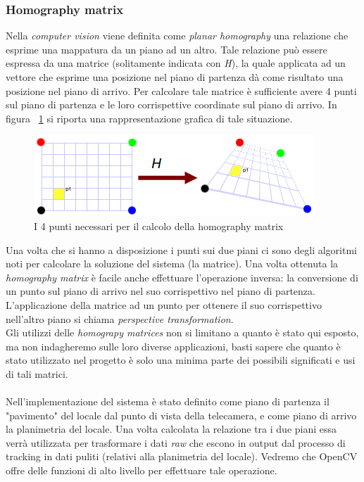 \subsubsection{Homography matrix}

Nella \textit{computer vision} viene definita come \textit{planar homography} una relazione che esprime una mappatura da un piano ad un altro. Tale relazione può essere espressa da una matrice (solitamente indicata con \textit{H}), la quale applicata ad un vettore che esprime una posizione nel piano di partenza dà come risultato una posizione nel piano di arrivo. Per calcolare tale matrice è sufficiente avere 4 punti sul piano di partenza e le loro corrispettive coordinate sul piano di arrivo. In figura ~\ref{fig:track2} si riporta una rappresentazione grafica di tale situazione.
\begin{figure}[htpb] 
\centering 
\includegraphics[scale=1.0]{./images/track2.png} 
\caption{I 4 punti necessari per il calcolo della homography matrix} 
\label{fig:track2}
\end{figure} 

Una volta che si hanno a disposizione i punti sui due piani ci sono degli algoritmi noti per calcolare la soluzione del sistema (la matrice). Una volta ottenuta la \textit{homography matrix} è facile anche effettuare l'operazione inversa: la conversione di un punto sul piano di arrivo nel suo corrispettivo nel piano di partenza. L'applicazione della matrice ad un punto per ottenere il suo corrispettivo nell'altro piano si chiama \textit{perspective transformation}. \\
Gli utilizzi delle \textit{homograpy matrices} non si limitano a quanto è stato qui esposto, ma non indagheremo sulle loro diverse applicazioni, basti sapere che quanto è stato utilizzato nel progetto è solo una minima parte dei possibili significati e usi di tali matrici. \\ \\
Nell'implementazione del sistema è stato definito come piano di partenza il "pavimento" del locale dal punto di vista della telecamera, e come piano di arrivo la planimetria del locale. Una volta calcolata la relazione tra i due piani essa verrà utilizzata per trasformare i dati \textit{raw} che escono in output dal processo di tracking in dati puliti (relativi alla planimetria del locale).
Vedremo che OpenCV offre delle funzioni di alto livello per effettuare tale operazione.

